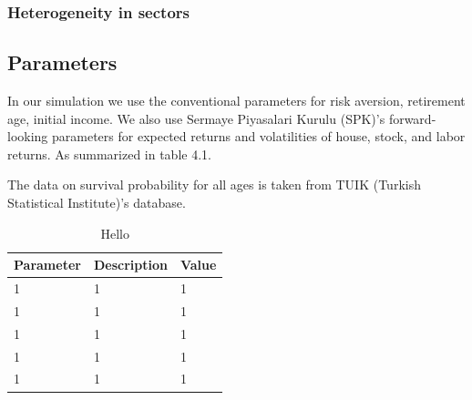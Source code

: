 \subsubsection{Heterogeneity in sectors}




\subsection{Parameters}
In our simulation we use the conventional parameters for risk aversion, retirement age, initial income. We also use Sermaye Piyasalari Kurulu (SPK)'s forward-looking parameters for expected returns and volatilities of house, stock, and labor returns. As summarized in table 4.1. 


The data on survival probability for all ages is taken from TUIK (Turkish Statistical Institute)'s database.  

\begin{table}
	\centering
	\begin{tabular}[c]{lll}
		Parameter&Description&Value\\
		\hline
		1&1&1\\
		1&1&1\\
		1&1&1\\
		1&1&1\\
		1&1&1
	\end{tabular}
	\caption{Hello}
\end{table}
